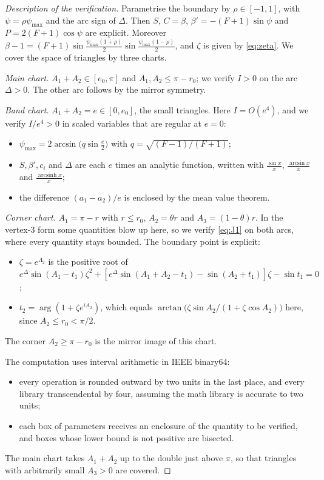 \documentclass[11pt]{amsart}
\theoremstyle{remark}
\begin{document}
\begin{proof}[Description of the verification]
Parametrise the boundary by $\rho\in[-1,1]$, with $\psi=\rho\psi_{\max}$ and the arc sign of $\Delta$. Then $S$,
$C=\beta$, $\beta'=-(F+1)\sin\psi$ and $P=2(F+1)\cos\psi$ are explicit. Moreover
$\beta-1=(F+1)\sin\frac{\psi_{\max}(1+\rho)}2\sin\frac{\psi_{\max}(1-\rho)}2$, and $\zeta$ is given by \eqref{eq:zeta}.
We cover the space of triangles by three charts.

\emph{Main chart.} $A_1+A_2\in[e_0,\pi]$ and $A_1,A_2\le\pi-r_0$; we verify $I>0$ on the arc $\Delta>0$. The other arc
follows by the mirror symmetry.

\emph{Band chart.} $A_1+A_2=e\in[0,e_0]$, the small triangles. Here $I=O(e^4)$, and we verify $I/e^4>0$ in scaled
variables that are regular at $e=0$:
\begin{itemize}
\item $\psi_{\max}=2\arcsin\bigl(q\sin\frac e2\bigr)$ with $q=\sqrt{(F-1)/(F+1)}$;
\item $S,\beta',c_i$ and $\Delta$ are each $e$ times an analytic function, written with $\frac{\sin x}x$,
  $\frac{\arcsin x}x$ and $\frac{\operatorname{arcsinh}x}x$;
\item the difference $(a_1-a_2)/e$ is enclosed by the mean value theorem.
\end{itemize}

\emph{Corner chart.} $A_1=\pi-r$ with $r\le r_0$, $A_2=\theta r$ and $A_3=(1-\theta)r$. In the vertex-$3$ form some
quantities blow up here, so we verify \eqref{eq:J1} on both arcs, where every quantity stays bounded. The boundary point
is explicit:
\begin{itemize}
\item $\zeta=e^{\Lambda_2}$ is the positive root of
  $e^{\Delta}\sin(A_1-t_1)\zeta^2+[e^{\Delta}\sin(A_1+A_2-t_1)-\sin(A_2+t_1)]\zeta-\sin t_1=0$;
\item $t_2=\arg(1+\zeta e^{iA_2})$, which equals $\arctan\bigl(\zeta\sin A_2/(1+\zeta\cos A_2)\bigr)$ here, since
  $A_2\le r_0<\pi/2$.
\end{itemize}
The corner $A_2\ge\pi-r_0$ is the mirror image of this chart.

The computation uses interval arithmetic in IEEE binary64:
\begin{itemize}
\item every operation is rounded outward by two units in the last place, and every library transcendental by four,
  assuming the math library is accurate to two units;
\item each box of parameters receives an enclosure of the quantity to be verified, and boxes whose lower bound is not
  positive are bisected.
\end{itemize}
The main chart takes $A_1+A_2$ up to the double just above $\pi$, so that triangles with arbitrarily small $A_3>0$ are
covered.


\end{proof}
\end{document}
